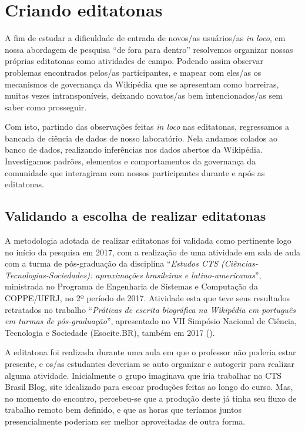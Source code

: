 \section{Criando editatonas}

A fim de estudar a dificuldade de entrada de novos/as usuários/as \textit{in loco}, em nossa abordagem de pesquisa ``de fora para dentro'' resolvemos organizar nossas próprias editatonas como atividades de campo. Podendo assim observar problemas encontrados pelos/as participantes, e mapear com eles/as os mecanismos de governança da Wikipédia que se apresentam como barreiras, muitas vezes intransponíveis, deixando novatos/as bem intencionados/as sem saber como prosseguir.

Com isto, partindo das observações feitas \textit{in loco} nas editatonas, regressamos a bancada de ciência de dados de nosso laboratório. Nela andamos colados ao banco de dados, realizando inferências nos dados abertos da Wikipédia. Investigamos padrões, elementos e comportamentos da governança da comunidade que interagiram com nossos participantes durante e após as editatonas.

\subsection{Validando a escolha de realizar editatonas}

A metodologia adotada de realizar editatonas foi validada como pertinente logo no início da pesquisa em 2017, com a realização de uma atividade em sala de aula com a turma de pós-graduação da disciplina ``\textit{Estudos CTS (Ciências-Tecnologias-Sociedades): aproximações brasileiras e latino-americanas}'', ministrada no Programa de Engenharia de Sistemas e Computação da COPPE/UFRJ, no 2º período de 2017. Atividade esta que teve seus resultados retratados no trabalho ``\textit{Práticas de escrita biográfica na Wikipédia em português em turmas de pós-graduação}'', apresentado no VII Simpósio Nacional de Ciência, Tecnologia e Sociedade (Esocite.BR), também em 2017 (\cite{andrade_historias_2017}).

A editatona foi realizada durante uma aula em que o professor não poderia estar presente, e os/as estudantes deveriam se auto organizar e autogerir para realizar alguma atividade. Inicialmente o grupo imaginava que iria trabalhar no CTS Brasil Blog, site idealizado para escoar produções feitas ao longo do curso. Mas, no momento do encontro, percebeu-se que a produção deste já tinha seu fluxo de trabalho remoto bem definido, e que as horas que teríamos juntos presencialmente poderiam ser melhor aproveitadas de outra forma.


